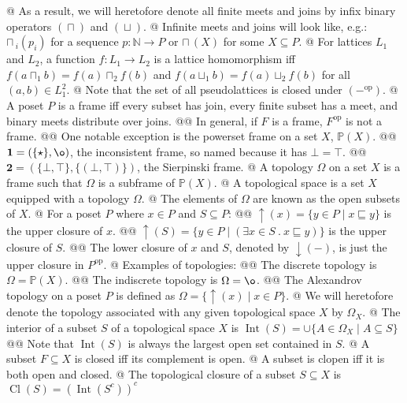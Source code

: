 \documentclass[]{article}
\newcommand{\mbf}[1]{\ensuremath{\mathbf{#1}}}     %
\newcommand{\mbb}[1]{\ensuremath{\mathbb{#1}}}     %
\newcommand{\join}[0]{\ensuremath{\mathrel{\sqcup}}}
\newcommand{\meet}[0]{\ensuremath{\mathrel{\sqcap}}}
\newcommand{\bigmeet}[0]{\ensuremath{{\sqcap}\,}}
\newcommand{\poset}[0]{\ensuremath{\mathrel{\sqsubseteq}}}
\newcommand{\opcat}[1]{{#1}^{\mathrm{op}}}
\DeclareMathOperator{\interior}{Int}
\DeclareMathOperator{\closure}{Cl}
\renewcommand{\complement}[1]{{{#1}^{c}}}
\begin{document}
\begin{easylist}[itemize]
{}
@ {%
  As a result, we will heretofore denote all finite meets and joins by infix
  binary operators $(\meet)$ and $(\join)$.
}
@ {%
  Infinite meets and joins will look like, e.g.: $\bigmeet_i(p_i)$ for a
  sequence $p : \mbb{N} \to P$ or $\bigmeet(X)$ for some $X \subseteq P$.
}
@ {%
  For lattices $L_1$ and $L_2$, a function $f : L_1 \to L_2$ is a
  \textsf{lattice homomorphism} iff $f(a \meet_1 b) = f(a) \meet_2 f(b)$
  and $f(a \join_1 b) = f(a) \join_2 f(b)$ for all $(a, b) \in L_1^2$.
}
@ Note that the set of all pseudolattices is closed under $(\opcat{-})$.
@ {%
  A poset $P$ is a \textsf{frame} iff every subset has join, every finite subset
  has a meet, and binary meets distribute over joins.
}
@@ In general, if $F$ is a frame, $\opcat{F}$ is not a frame.
@@ One notable exception is the \textsf{powerset frame} on a set $X$, $\mbb{P}(X)$.
@@ {%
  $\mbf{1} = (\{\star\}, \o)$, the \textsf{inconsistent frame}, so named
  because it has $\bot = \top$.
}
@@ $\mbf{2} = (\{\bot,\top\}, \{(\bot, \top)\})$, the \textsf{Sierpinski frame}.
@ {%
  A \textsf{topology} $\Omega$ on a set $X$ is a frame such that $\Omega$ is a
  subframe of $\mbb{P}(X)$.
}
@ A \textsf{topological space} is a set $X$ equipped with a topology $\Omega$.
@ The elements of $\Omega$ are known as the \textsf{open subsets} of $X$.
@ For a poset $P$ where $x \in P$ and $S \subseteq P$:
@@ {%
  ${\uparrow}(x) = \{y \in P \mid x \poset y\}$
  is the \textsf{upper closure} of $x$.
}
@@ {%
  ${\uparrow}(S) = \{y \in P \mid (\exists x \in S ~ . ~ x \poset y)\}$
  is the \textsf{upper closure} of $S$.
}
@@ {%
  The \textsf{lower closure} of $x$ and $S$, denoted by ${\downarrow}(-)$,
  is just the upper closure in $\opcat{P}$.
}
@ Examples of topologies:
@@ The \textsf{discrete topology} is $\Omega = \mbb{P}(X)$.
@@ The \textsf{indiscrete topology} is $\Omega = \o$.
@@ {%
  The \textsf{Alexandrov topology} on a poset $P$ is defined as
  $\Omega = \{{\uparrow}(x) \mid x \in P\}$.
}
@ {%
  We will heretofore denote the topology associated with any given topological
  space $X$ by $\Omega_X$.
}
@ {%
  The \textsf{interior} of a subset $S$ of a topological space $X$ is
  $\interior(S) = \cup \{A \in \Omega_X \mid A \subseteq S\}$
}
@@ Note that $\interior(S)$ is always the largest open set contained in $S$.
@ A subset $F \subseteq X$ is \textsf{closed} iff its complement is open.
@ A subset is \textsf{clopen} iff it is both open and closed.
@ {%
  The \textsf{topological closure} of a subset $S \subseteq X$ is
  $\closure(S) = \complement{(\interior(\complement{S}))}$
}
\end{easylist}
\end{document}
